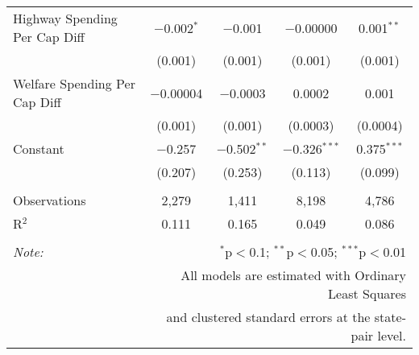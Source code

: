 \begin{table}[!htbp]
\begin{tabular}{@{\extracolsep{5pt}}lcccc}
  Highway Spending Per Cap Diff & $-$0.002$^{*}$ & $-$0.001 & $-$0.00000 & 0.001$^{**}$ \\ 
  & (0.001) & (0.001) & (0.001) & (0.001) \\ 
  Welfare Spending Per Cap Diff & $-$0.00004 & $-$0.0003 & 0.0002 & 0.001 \\ 
  & (0.001) & (0.001) & (0.0003) & (0.0004) \\ 
  Constant & $-$0.257 & $-$0.502$^{**}$ & $-$0.326$^{***}$ & 0.375$^{***}$ \\ 
  & (0.207) & (0.253) & (0.113) & (0.099) \\ 
 \hline \\[-1.8ex] 
Observations & 2,279 & 1,411 & 8,198 & 4,786 \\ 
R$^{2}$ & 0.111 & 0.165 & 0.049 & 0.086 \\ 
\hline 
\hline \\[-1.8ex] 
\textit{Note:}  & \multicolumn{4}{r}{$^{*}$p$<$0.1; $^{**}$p$<$0.05; $^{***}$p$<$0.01} \\ 
 & \multicolumn{4}{r}{All models are estimated with Ordinary Least Squares} \\ 
 & \multicolumn{4}{r}{and clustered standard errors at the state-pair level.} \\ 
\end{tabular} 
\end{table} 
